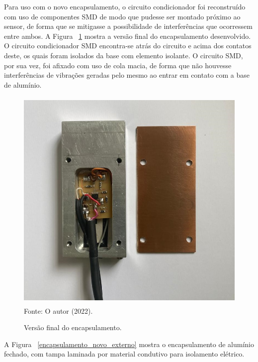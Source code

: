 \documentclass[
	12pt,				
	oneside,			
	a4paper,			
	english,			
	brazil,			
	]{abntex2ppgsi}
\begin{document}
Para uso com o novo encapsulamento, o circuito condicionador foi reconstruído com uso de componentes SMD de modo que pudesse ser montado próximo ao sensor, de forma que se mitigasse a possibilidade de interferências que ocorressem entre ambos. A Figura ~\ref{encapsulamento_novo_interno} mostra a versão final do encapsulamento desenvolvido. O circuito condicionador SMD encontra-se atrás do circuito e acima dos contatos deste, os quais foram isolados da base com elemento isolante. O circuito SMD, por sua vez, foi afixado com uso de cola macia, de forma que não houvesse interferências de vibrações geradas pelo mesmo ao entrar em contato com a base de alumínio.

\begin{figure}[H]
\centering
\caption {Versão final do encapsulamento. }
\includegraphics[width=\textwidth,height=110mm,keepaspectratio]{encapsulamento_novo_interno} \\
Fonte: O autor (2022).
\label{encapsulamento_novo_interno}
\end{figure} 

A Figura ~\ref{encapsulamento_novo_externo} mostra o encapsulamento de alumínio fechado, com tampa laminada por material condutivo para isolamento elétrico. 
\end{document}

